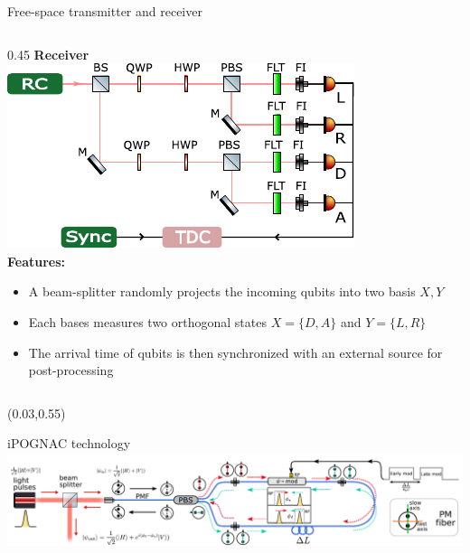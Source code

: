 \documentclass[final]{beamer}
\begin{document}
\begin{frame}
\begin{textblock}{0.96}
\begin{block}{\large {Free-space transmitter and receiver}}
\begin{columns}
				\begin{column}{0.45\TPHorizModule}
					{\textbf{Receiver\\}}
					\vskip 0.6cm
					\includegraphics[scale=4]{imgs/state_analyzer_800.pdf}\\
					{\textbf{Features:\\}}
					\begin{itemize}
						\item A beam-splitter randomly projects the incoming qubits into two basis $X, Y$
						\item Each bases measures two orthogonal states $X = \{D, A\}$ and $Y = \{L, R\}$
						\item The arrival time of qubits is then synchronized with an external source for post-processing
					\end{itemize}
				\end{column}

			\end{columns}
		\end{block}
	\end{textblock}

	\begin{textblock}{0.965}(0.03,0.55)
		\begin{block}{\large iPOGNAC technology }
			\vskip 0.2cm
			\includegraphics[scale=3.9]{imgs/ipognac.pdf} \\
			\begin{columns}


\end{columns}
\end{block}
\end{textblock}
\end{frame}
\end{document}
